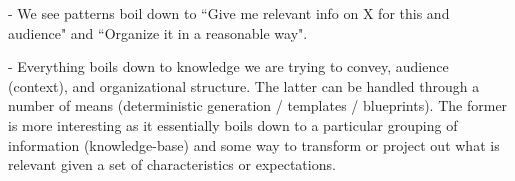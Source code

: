 - We see patterns boil down to ``Give me relevant info on X for this \sf{} and 
audience" and ``Organize it in a reasonable way".

- Everything boils down to knowledge we are trying to convey, audience 
(context), and organizational structure. The latter can be 
handled through a number of means (deterministic generation / templates / 
blueprints). The former is more interesting as it essentially boils down to a 
particular grouping of information (knowledge-base) and some way to transform 
or project out what is relevant given a set of characteristics or expectations.